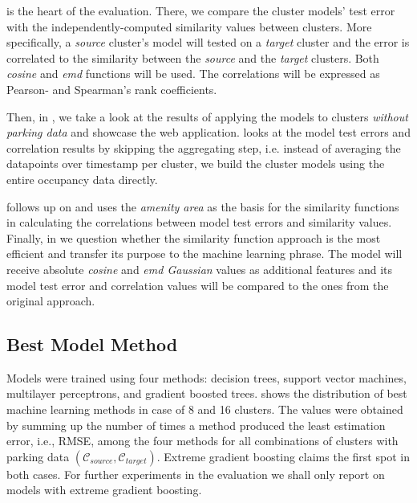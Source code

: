  is the heart of the evaluation. 
There, we compare the cluster models' test error with the independently-computed similarity values between clusters. 
More specifically, a \textit{source} cluster's model will tested on a \textit{target} cluster and the error is correlated to the similarity between the \textit{source} and the \textit{target} clusters. 
Both \textit{cosine} and \textit{emd} functions will be used. The correlations will be expressed as Pearson- and Spearman's rank coefficients.

Then, in , we take a look at the results of applying the models to clusters \textit{without parking data} and showcase the web application.  looks at the model test errors and correlation results by skipping the aggregating step, i.e. instead of averaging the datapoints over timestamp per cluster, we build the cluster models using the entire occupancy data directly. 

 follows up on  and uses the \textit{amenity area} as the basis for the similarity functions in calculating the correlations between model test errors and similarity values. Finally, in  we question whether the similarity function approach is the most efficient and transfer its purpose to the machine learning phrase. The model will receive absolute \textit{cosine} and \textit{emd Gaussian} values as additional features and its model test error and correlation values will be compared to the ones from the original approach.

\subsection{Best Model Method}
\label{evaluation:best_model}
Models were trained using four methods: decision trees, support vector machines, multilayer perceptrons, and gradient boosted trees.  shows the distribution of best machine learning methods in case of 8 and 16 clusters.
The values were obtained by summing up the number of times a method produced the least estimation error, i.e., RMSE, among the four methods for all combinations of clusters with parking data $(\mathcal{C}_{source}, \mathcal{C}_{target})$.
Extreme gradient boosting claims the first spot in both cases.
For further experiments in the evaluation we shall only report on models with extreme gradient boosting.


